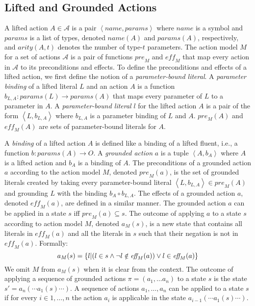 \documentclass{article}
\newcommand{\tuple}[1]{\ensuremath{\left \langle #1 \right \rangle }}
\newcommand{\pre}{\textit{pre}}
\newcommand{\params}{\textit{params}}
\newcommand{\eff}{\textit{eff}}
\newcommand{\name}{\textit{name}}
\newcommand{\liftl}{L}
\newcommand{\lifta}{A}
\begin{document}
\subsection{Lifted and Grounded Actions}
A lifted action $\lifta\in \mathcal{A}$ is a pair $\tuple{\name, \params}$ 
where $\name$ is a symbol and $\params$ is a list of types, 
denoted $\name(\lifta)$ and $\params(\lifta)$, respectively, and $arity(\lifta,t)$ denotes the number of type-$t$ parameters. 
The action model $M$ for a set of actions $\mathcal{A}$ 
is a pair of functions $\pre_M$ and $\eff_M$ that map every action in $\mathcal{A}$ to its preconditions and effects. 
To define the preconditions and effects of a lifted action, 
we first define the notion of a \emph{parameter-bound literal}. 
A \emph{parameter binding} of a lifted literal $\liftl$ and an action $\lifta$ is a function $b_{\liftl,\lifta}: \params(\liftl)\rightarrow \params(\lifta)$ that maps every parameter of $\liftl$ to a parameter in $\lifta$. 
A \emph{parameter-bound literal} $l$ for the lifted action $\lifta$ is a 
pair of the form $\tuple{\liftl,b_{\liftl,\lifta}}$ where $b_{\liftl,\lifta}$ is a parameter binding of $\liftl$ and $\lifta$. 
$\pre_M(\lifta)$ and $\eff_M(\lifta)$ are sets of parameter-bound literals for $\lifta$. 




A \emph{binding} of a lifted action $\lifta$ is defined like a binding of a lifted fluent, i.e., a function $b:\params(\lifta)\rightarrow O$. 
A \emph{grounded action} $a$ is a tuple $\tuple{\lifta, b_\lifta}$ where $\lifta$ is a lifted action and $b_\lifta$ is a binding of $\lifta$. 
The preconditions of a grounded action $a$ according to the action model $M$, denoted $\pre_M(a)$, is the set of grounded literals created by taking every parameter-bound literal $\tuple{\liftl, b_{\liftl,\lifta}}\in \pre_M(\lifta)$ and grounding $\liftl$ with the binding $b_\lifta\circ b_{\liftl,\lifta}$. 
The effects of a grounded action $a$, denoted $\eff_M(a)$, are defined in a similar manner. 
The grounded action $a$ can be applied in a state $s$ iff $\pre_M(a)\subseteq s$. 
The outcome of applying $a$ to a state $s$ according to action model $M$, denoted $a_M(s)$, is a new state that contains all literals in $\eff_M(a)$ and all the literals in $s$ such that their negation is not in $\eff_M(a)$. 
Formally:
\begin{equation}\small
    a_M(s)=\{ l | (l\in s \wedge \neg l\notin \eff_M(a)) \vee l\in \eff_M(a) \} 
\end{equation}
We omit $M$ from $a_M(s)$ when it is clear from the context.
The outcome of applying a sequence of grounded actions $\pi=(a_1,\ldots a_n)$ to a state $s$ is the state $s'=a_n(\cdots a_1(s)\cdots)$. 
A sequence of actions $a_1,\ldots, a_n$ can be applied to a state $s$ 
if for every $i\in 1,\ldots,n$ the action $a_i$ is applicable in the state 
$a_{i-1}(\cdots a_1(s)\cdots)$. 
\end{document}
